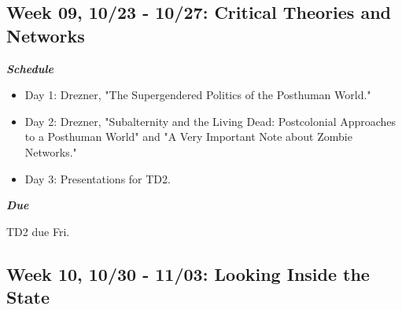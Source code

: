 \documentclass[11pt,]{article}
\begin{document}
\hypertarget{week-09-1023---1027-critical-theories-and-networks}{%
\subsection{Week 09, 10/23 - 10/27: Critical Theories and
Networks}\label{week-09-1023---1027-critical-theories-and-networks}}

\begin{multicols}{2}

\textbf{\textit{Schedule}}

\begin{itemize}

\item Day 1: Drezner, "The Supergendered Politics of the Posthuman World."

\item Day 2: Drezner, "Subalternity and the Living Dead: Postcolonial Approaches to a Posthuman World" and "A Very Important Note about Zombie Networks."

\item Day 3: Presentations for TD2. 

\end{itemize}

\columnbreak

\begin{flushright}

\textbf{\textit{Due}}

TD2 due Fri.

\end{flushright}

\end{multicols}

\newpage

\hypertarget{week-10-1030---1103-looking-inside-the-state}{%
\subsection{Week 10, 10/30 - 11/03: Looking Inside the
State}\label{week-10-1030---1103-looking-inside-the-state}}
\end{document}
